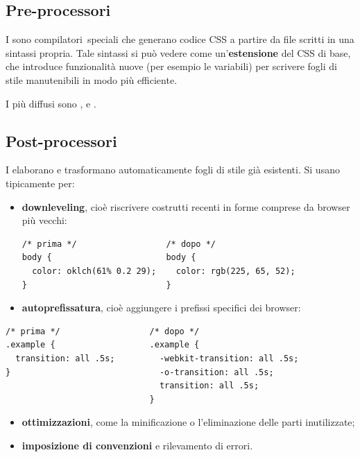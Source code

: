 \subsection{Pre-processori}

I  sono \guillemotleft compilatori\guillemotright\ speciali che generano
codice CSS a partire da file scritti in una sintassi propria. Tale sintassi si
può vedere come un'\textbf{estensione} del CSS di base, che introduce
funzionalità nuove (per esempio le variabili) per scrivere fogli di stile
manutenibili in modo più efficiente.

I più diffusi sono ,  e .

\subsection{Post-processori}

I  elaborano e trasformano automaticamente fogli di stile
già esistenti. Si usano tipicamente per:

\begin{itemize}
  \item \textbf{downleveling}, cioè riscrivere costrutti recenti in forme
        comprese da browser più vecchi:

\begin{lstlisting}[style=css]
/* prima */                  /* dopo */
body {                       body {
  color: oklch(61% 0.2 29);    color: rgb(225, 65, 52);
}                            }
\end{lstlisting}

  \item \textbf{autoprefissatura}, cioè aggiungere i prefissi specifici dei
        browser:
\end{itemize}

\begin{lstlisting}[style=css]
/* prima */                  /* dopo */
.example {                   .example {
  transition: all .5s;         -webkit-transition: all .5s;
}                              -o-transition: all .5s;
                               transition: all .5s;
                             }
\end{lstlisting}

\begin{itemize}
  \item \textbf{ottimizzazioni}, come la minificazione o l'eliminazione delle
        parti inutilizzate;
  \item \textbf{imposizione di convenzioni} e rilevamento di errori.
\end{itemize}

